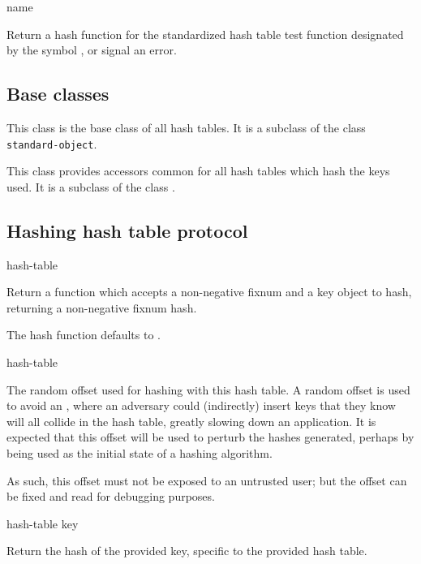 {name}

Return a hash function for the standardized hash table test function
designated by the symbol , or signal an error.

\subsection{Base classes}


This class is the base class of all hash tables.  It is a subclass of
the class \texttt{standard-object}.


This class provides accessors common for all hash tables which hash
the keys used.  It is a subclass of the class .

\subsection{Hashing hash table protocol}

 {hash-table}


Return a function which accepts a non-negative fixnum 
and a key object to hash, returning a non-negative fixnum hash.

The hash function defaults to
.

 {hash-table}


The random offset used for hashing with this hash table.  A random
offset is used to avoid an , where
an adversary could (indirectly) insert keys that they know will all
collide in the hash table, greatly slowing down an application.  It is
expected that this offset will be used to perturb the hashes
generated, perhaps by being used as the initial state of a hashing
algorithm.

As such, this offset must not be exposed to an untrusted user; but the
offset can be fixed and read for debugging purposes.

 {hash-table key}

Return the hash of the provided key, specific to the provided hash table.

